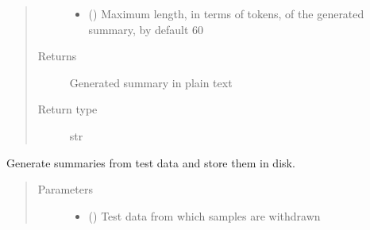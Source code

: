 \documentclass[letterpaper,10pt,english]{sphinxmanual}
\begin{document}
\begin{fulllineitems}
\begin{fulllineitems}
\begin{quote}
\begin{description}
\begin{itemize}
\item {} 
\sphinxAtStartPar
{} (\sphinxstyleliteralemphasis{\sphinxupquote{, }}) \textendash{} Maximum length, in terms of tokens, of the generated summary, by default 60

\end{itemize}

\item[{Returns}] \leavevmode
\sphinxAtStartPar
Generated summary in plain text

\item[{Return type}] \leavevmode
\sphinxAtStartPar
str

\end{description}\end{quote}

\end{fulllineitems}


\begin{fulllineitems}
\label{\detokenize{code:gpt2_summarizer.GPT2Summarizer.generate_summaries_from_dataset}}
\sphinxAtStartPar
Generate summaries from test data and store them in disk.
\begin{quote}\begin{description}
\item[{Parameters}] \leavevmode\begin{itemize}
\item {} 
\sphinxAtStartPar
{} () \textendash{} Test data from which samples are withdrawn


\end{itemize}
\end{description}
\end{quote}
\end{fulllineitems}
\end{fulllineitems}
\end{document}
